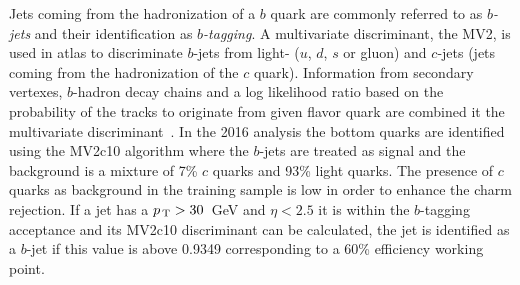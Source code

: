 Jets coming from the hadronization of a $b$ quark are commonly referred to as
\emph{$b$-jets} and their identification as \emph{$b$-tagging}. A multivariate
discriminant, the MV2, is used in \gls{atlas} to discriminate $b$-jets from
light- ($u$, $d$, $s$ or gluon) and $c$-jets (jets coming from the hadronization
of the $c$ quark). Information from secondary vertexes, $b$-hadron decay chains
and a log likelihood ratio based on the probability of the tracks to originate
from given flavor quark are combined it the multivariate
discriminant~\cite{BTagging}. In the 2016 analysis the bottom quarks are
identified using the MV2c10 algorithm where the $b$-jets are treated as signal
and the background is a mixture of 7\% $c$ quarks and 93\% light quarks. The
presence of $c$ quarks as background in the training sample is low in order to
enhance the charm rejection. If a jet has a $p_\mathrm{\, T} > 30$~GeV and $\eta < 2.5$ it
is within the $b$-tagging acceptance and its MV2c10 discriminant can be
calculated, the jet is identified as a $b$-jet if this value is above 0.9349
corresponding to a 60\% efficiency working point.
